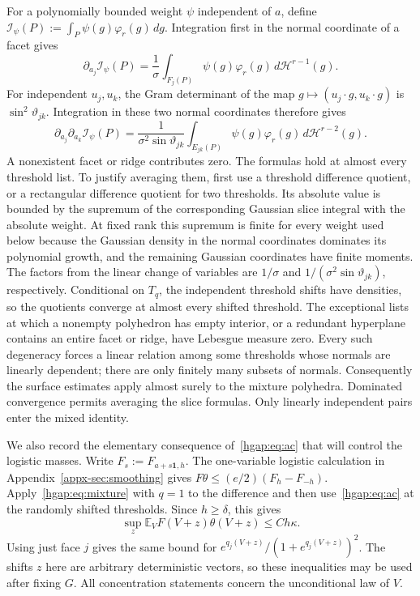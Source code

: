 \documentclass[11pt,letterpaper]{article}
\theoremstyle{remark}
\newcommand{\E}{\mathbb E}
\newcommand{\dd}{\,d}
\begin{document}
For a polynomially bounded weight $\psi$ independent of $a$, define
$\mathcal I_\psi(P):=\int_P\psi(g)\varphi_r(g)\dd g$.
Integration first in the normal coordinate of a facet gives
\begin{equation}\label{hgap:eq:coarea-one}
 \partial_{a_j}\mathcal I_\psi(P)
     =\frac1\sigma\int_{F_j(P)}\psi(g)\varphi_r(g)
                                  \dd\mathcal H^{r-1}(g).
\end{equation}
For independent $u_j,u_k$, the Gram determinant of the map
$g\mapsto(u_j\cdot g,u_k\cdot g)$ is $\sin^2\vartheta_{jk}$.
Integration in these two normal coordinates therefore gives
\begin{equation}\label{hgap:eq:coarea-two}
 \partial_{a_j}\partial_{a_k}\mathcal I_\psi(P)
     =\frac1{\sigma^2\sin\vartheta_{jk}}
       \int_{E_{jk}(P)}\psi(g)\varphi_r(g)
                                  \dd\mathcal H^{r-2}(g).
\end{equation}
A nonexistent facet or ridge contributes zero. The formulas hold at
almost every threshold list. To justify averaging them, first use a
threshold difference quotient, or a rectangular difference quotient
for two thresholds. Its absolute value is bounded
by the supremum of the corresponding Gaussian slice integral with the
absolute weight. At fixed rank this supremum is finite for every weight
used below because the Gaussian density in the normal coordinates dominates
its polynomial growth, and the remaining Gaussian coordinates have
finite moments. The factors from the linear change of variables are
$1/\sigma$ and $1/(\sigma^2\sin\vartheta_{jk})$, respectively.
Conditional on $T_q$, the independent threshold shifts have densities,
so the quotients converge at almost every shifted threshold. The
exceptional lists at which a nonempty polyhedron has empty interior,
or a redundant hyperplane contains an entire facet or ridge, have
Lebesgue measure zero. Every such degeneracy forces a linear relation
among some thresholds whose normals are linearly dependent; there
are only finitely many subsets of normals. Consequently the surface
estimates apply almost surely to the mixture polyhedra. Dominated
convergence permits averaging the slice formulas. Only linearly
independent pairs enter the mixed identity.

We also record the elementary consequence of~\eqref{hgap:eq:ac} that
will control the logistic masses. Write $F_s:=F_{a+s\mathbf1,h}$.
The one-variable logistic calculation in
Appendix~\ref{appx-sec:smoothing} gives
$F\theta\le (e/2)(F_h-F_{-h})$. Apply~\eqref{hgap:eq:mixture} with
$q=1$ to the difference and then use~\eqref{hgap:eq:ac} at the randomly
shifted thresholds. Since $h\ge\delta$, this gives
\begin{equation}\label{hgap:eq:logistic-mass}
 \sup_z\E_V F(V+z)\theta(V+z)\le Ch\kappa.
\end{equation}
Using just face $j$ gives the same bound for
$e^{q_j(V+z)}/(1+e^{q_j(V+z)})^2$. The shifts $z$ here are arbitrary
deterministic vectors, so these inequalities may be used after fixing
$G$. All concentration statements concern the unconditional law of $V$.
\end{document}
